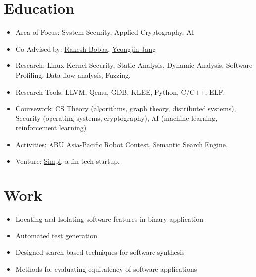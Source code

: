 \documentclass[11pt,a4paper,sans]{moderncv}
\begin{document}
\section{Education}
{
    \begin{itemize}
    \item Area of Focus: System Security, Applied Cryptography, AI
    \item Co-Advised by:
    \href{https://eecs.oregonstate.edu/people/bobba-rakesh}{Rakesh Bobba},
    \href{https://www.unexploitable.systems/}{Yeongjin Jang}
    \item Research: Linux Kernel Security, Static Analysis, Dynamic Analysis,
    Software Profiling, Data flow analysis, Fuzzing.
    \item Research Tools: LLVM, Qemu, GDB, KLEE, Python, C/C++, ELF.
    \item Coursework: CS Theory (algorithms, graph theory, distributed systems),
    Security (operating systems, cryptography), AI (machine learning,
    reinforcement learning)
    \end{itemize}
}
{
    \begin{itemize}
    \item Activities: ABU Asia-Pacific Robot Contest, Semantic Search Engine.
    \item Venture: \href{https://www.getsimpl.com}{Simpl}, a fin-tech startup.
    \end{itemize}
}

\section{Work}

{
    \begin{itemize}
    \item Locating and Isolating software features in binary application
    \item Automated test generation
    \item Designed search based techniques for software synthesis
    \item Methods for evaluating equivalency of software applications
    \end{itemize}
}
\end{document}
